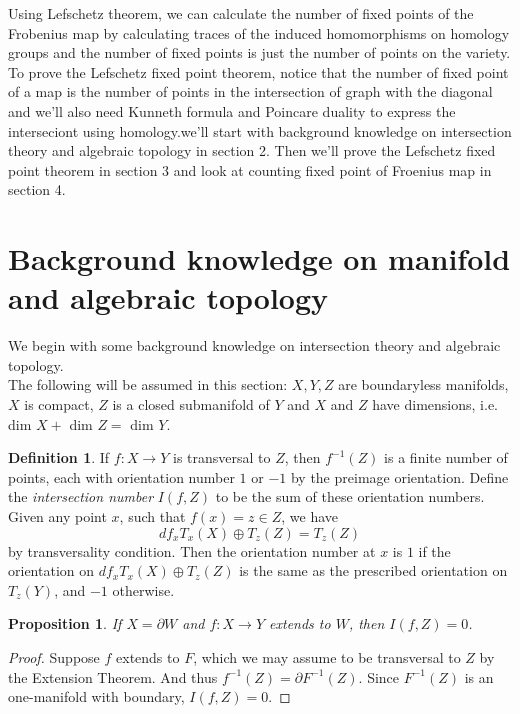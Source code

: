 \documentclass[psamsfonts]{amsart}
\newtheorem{prop}[theorem]{Proposition}
\theoremstyle{definition}
\newtheorem{defn}[theorem]{Definition}
\theoremstyle{remark}
\numberwithin{equation}{section}
\begin{document}
		Using Lefschetz theorem, we can calculate the number of fixed points of the Frobenius map by calculating traces of the induced homomorphisms on homology groups and the number of fixed points is just the number of points on the variety.\\
		\indent To prove the Lefschetz fixed point theorem, notice that the number of fixed point of a map is the number of points in the intersection of graph with the diagonal and we'll also need Kunneth formula and Poincare duality to express the interseciont using homology.we'll start with background knowledge on intersection theory and algebraic topology in section 2.  Then we'll prove the Lefschetz fixed point theorem in section 3 and look at counting fixed point of Froenius map in section 4.
		
	\section{Background knowledge on manifold and algebraic topology}
		We begin with some background knowledge on intersection theory and algebraic topology.\\
		\indent The following will be assumed in this section: $X,Y,Z$ are boundaryless manifolds, $X$ is compact, $Z$ is a closed submanifold of $Y$ and $X$ and $Z$ have  dimensions, i.e. dim $X +$ dim $Z = $ dim $Y$.
		\begin{defn}
			If $f: X \to Y$ is transversal to $Z$, then $f^{-1}(Z)$ is a finite number of points, each with orientation number $1$ or $-1$ by the preimage orientation. Define the \textit{intersection number} $I(f,Z)$ to be the sum of these orientation numbers.
		Given any point $x$, such that $f(x) = z \in Z$, we have
		\begin{equation}
			df_xT_x(X) \oplus T_z(Z) = T_z(Z)	
		\end{equation}
		by transversality condition. Then the orientation number at $x$ is $1$ if the orientation on $df_xT_x(X) \oplus T_z(Z)$ is the same as the prescribed orientation on $T_z(Y)$, and $-1$ otherwise.
		\end{defn}
		\begin{prop}
			If $X = \partial W$ and $f:X \to Y$ extends to $W$, then $I(f,Z)=0$.
		\end{prop}
		\begin{proof}
			Suppose $f$ extends to $F$, which we may assume to be transversal to $Z$ by the Extension Theorem. And thus $f^{-1}(Z) = \partial F^{-1}(Z)$. Since $F^{-1}(Z)$ is an one-manifold with boundary, $I(f,Z)=0$. 	
		\end{proof}
\end{document}
